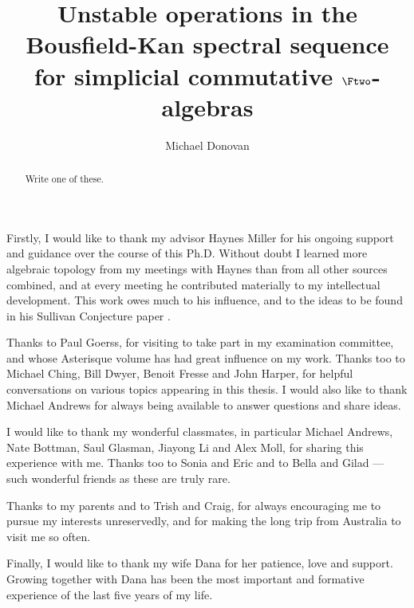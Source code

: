 \documentclass[11pt]{amsart} \renewcommand{\baselinestretch}{1.2}
\title[The Bousfield-Kan spectral sequence for simplicial algebras]{Unstable operations in the Bousfield-Kan spectral sequence for simplicial commutative $\Ftwo$-algebras}
\author[M.\ Donovan]{Michael Donovan}
\theoremstyle{plain}
\numberwithin{equation}{section} %
\theoremstyle{plain}
\numberwithin{equation}{chapter} %
\begin{document}
\begin{Contents Page}
\begin{abstract}
Write one of these.
\end{abstract}
\maketitle
\tableofcontents
\end{Contents Page}




\begin{ThankS}

Firstly, I would like to thank my advisor Haynes Miller for his ongoing support and guidance over the course of this Ph.D. Without doubt I learned more algebraic topology from my meetings with Haynes than from all other sources combined, and at every meeting he contributed materially to my intellectual development. This work owes much to his influence, and to the ideas to be found in his Sullivan Conjecture paper \cite{MillerSullivanConjecture.pdf}.

Thanks to Paul Goerss, for visiting to take part in my examination committee, and whose Asterisque volume \cite{MR1089001} has had great influence on my work.
Thanks too to Michael Ching, Bill Dwyer, Benoit Fresse and John Harper, for helpful conversations on various topics appearing in this thesis. I would also like to thank Michael Andrews for always being available to answer questions and share ideas.

I would like to thank my wonderful classmates, in particular Michael Andrews, Nate Bottman, Saul Glasman, Jiayong Li  and Alex Moll, for sharing this experience with me.
Thanks too to Sonia and Eric and to Bella and Gilad --- such wonderful friends as these are truly rare.

Thanks to my parents and to Trish and Craig, for always encouraging me to pursue my interests unreservedly, and for making the long trip from Australia to visit me so often.

Finally, I would like to thank my wife Dana for her patience, love and support. 
Growing together with Dana has been the most important and formative experience of the last five years of my life.


\end{ThankS}
\end{document}
